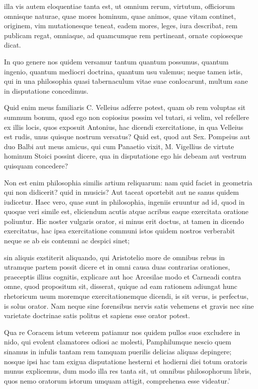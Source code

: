  illa vis autem eloquentiae tanta est, ut omnium rerum, virtutum, officiorum omnisque naturae, quae mores hominum, quae animos, quae vitam continet, originem, vim mutationesque teneat, eadem mores, leges, iura describat, rem publicam regat, omniaque, ad quamcumque rem pertineant, ornate copioseque dicat.

 In quo genere nos quidem versamur tantum quantum possumus, quantum ingenio, quantum mediocri doctrina, quantum usu valemus; neque tamen istis, qui in una philosophia quasi tabernaculum vitae suae conlocarunt, multum sane in disputatione concedimus.

 Quid enim meus familiaris C. Velleius adferre potest, quam ob rem voluptas sit summum bonum, quod ego non copiosius possim vel tutari, si velim, vel refellere ex illis locis, quos exposuit Antonius, hac dicendi exercitatione, in qua Velleius est rudis, unus quisque nostrum versatus? Quid est, quod aut Sex. Pompeius aut duo Balbi aut meus amicus, qui cum Panaetio vixit, M. Vigellius de virtute hominum Stoici possint dicere, qua in disputatione ego his debeam aut vestrum quisquam concedere?

 Non est enim philosophia similis artium reliquarum: nam quid faciet in geometria qui non didicerit? quid in musicis? Aut taceat oportebit aut ne sanus quidem iudicetur. Haec vero, quae sunt in philosophia, ingeniis eruuntur ad id, quod in quoque veri simile est, eliciendum acutis atque acribus eaque exercitata oratione poliuntur. Hic noster vulgaris orator, si minus erit doctus, at tamen in dicendo exercitatus, hac ipsa exercitatione communi istos quidem nostros verberabit neque se ab eis contemni ac despici sinet;

 sin aliquis exstiterit aliquando, qui Aristotelio more de omnibus rebus in utramque partem possit dicere et in omni causa duas contrarias orationes, praeceptis illius cognitis, explicare aut hoc Arcesilae modo et Carneadi contra omne, quod propositum sit, disserat, quique ad eam rationem adiungat hunc rhetoricum usum moremque exercitationemque dicendi, is sit verus, is perfectus, is solus orator. Nam neque sine forensibus nervis satis vehemens et gravis nec sine varietate doctrinae satis politus et sapiens esse orator potest.

 Qua re Coracem istum veterem patiamur nos quidem pullos suos excludere in nido, qui evolent clamatores odiosi ac molesti, Pamphilumque nescio quem sinamus in infulis tantam rem tamquam puerilis delicias aliquas depingere; nosque ipsi hac tam exigua disputatione hesterni et hodierni diei totum oratoris munus explicemus, dum modo illa res tanta sit, ut omnibus philosophorum libris, quos nemo oratorum istorum umquam attigit, comprehensa esse videatur.'

